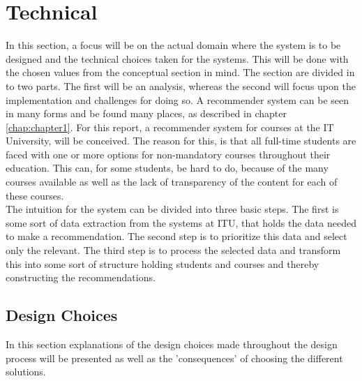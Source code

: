 \section{Technical}


In this section, a focus will be on the actual domain where the system is to be designed and the technical choices taken for the systems. This will be done with the chosen values from the conceptual section in mind. 
The section are divided in to two parts. The first will be an analysis, whereas the second will focus upon the implementation and challenges for doing so. 
A recommender system can be seen in many forms and be found many places, as described in chapter \ref{chap:chapter1}. For this report, a recommender system for courses at the IT University, will be conceived. The reason for this, is that all full-time students are faced with one or more options for non-mandatory courses throughout their education. This can, for some students, be hard to do, because of the many courses available as well as the lack of transparency of the content for each of these courses.\\

The intuition for the system can be divided into three basic steps. The first is some sort of data extraction from the systems at ITU, that holds the data needed to make a recommendation. The second step is to prioritize this data and select only the relevant. The third step is to process the selected data and transform this into some sort of structure holding students and courses and thereby constructing the recommendations.

\subsection{Design Choices}
In this section explanations of the design choices made throughout the design process will be presented as well as the 'consequences' of choosing the different solutions. 
